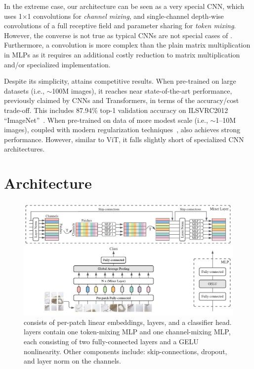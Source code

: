 In the extreme case, our architecture can be seen as a very special CNN, which uses 1$\times$1 convolutions for \emph{channel mixing}, and single-channel depth-wise convolutions of a full receptive field and parameter sharing for \emph{token mixing}.
However, the converse is not true as typical CNNs are not special cases of \name{}. Furthermore, a convolution is more complex than the plain matrix multiplication in MLPs as it requires an additional costly reduction to matrix multiplication and/or specialized implementation. 

Despite its simplicity, \name{} attains competitive results.
When pre-trained on large datasets (i.e.,  $\sim$100M images), it reaches near state-of-the-art performance, previously claimed by CNNs and Transformers, in terms of the accuracy/cost trade-off.
This includes 87.94\% top-1 validation accuracy on ILSVRC2012 ``ImageNet''~\citep{deng2009-imagenet}.
When pre-trained on data of more modest scale (i.e., $\sim$1--10M images), coupled with modern regularization techniques~\cite{deit,rw2019timm}, \name{} also achieves strong performance.
However, similar to ViT, it falls slightly short of specialized CNN architectures.

\section{\name{} Architecture}
\label{sec:architecture}
\begin{figure}[tb]
    \centering
    \includegraphics[width=.85\linewidth]{pics/Mixer.pdf}
    \caption{
     \fullname{} consists of per-patch linear embeddings, \name{} layers, and a classifier head.
     \name{} layers contain one token-mixing MLP and one channel-mixing MLP, each consisting of two fully-connected layers and a GELU nonlinearity.
     Other components include: skip-connections, dropout, and layer norm on the channels.
    }
    \vspace{-.2cm}
  \label{fig:architecture}
\end{figure}


